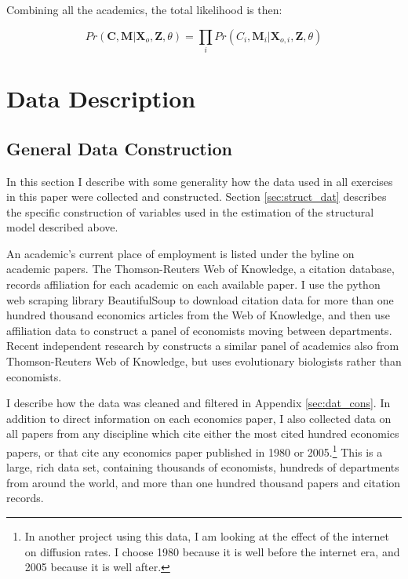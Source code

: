 Combining all the academics, the total likelihood is then:

\begin{equation}
    Pr(\mathbf{C},\mathbf{M}|\mathbf{X}_o,\mathbf{Z},\theta) = \prod_i Pr(C_i,\mathbf{M}_i|\mathbf{X}_{o,i}, \mathbf{Z}, \theta)
    \label{eq:fulllik}
\end{equation}

\section{Data Description}
\label{sec:dat}

\subsection{General Data Construction}

In this section I describe with some generality how the data used in all
exercises in this paper were collected and constructed.  Section
\ref{sec:struct_dat} describes the specific construction of variables
used in the estimation of the structural model described above.

An academic's current place of employment is listed under the byline on
academic papers. The Thomson-Reuters Web of Knowledge, a citation
database, records affiliation for each academic on each available paper. I use the
python web scraping library BeautifulSoup to download citation data for
more than one hundred thousand economics articles from the Web of
Knowledge, and then use affiliation data to construct a panel of
economists moving between departments. Recent independent research by
\citet{agrawal2013why} constructs a similar panel of academics also from
Thomson-Reuters Web of Knowledge, but uses evolutionary biologists rather than economists.

I describe how the data was cleaned and filtered in
Appendix \ref{sec:dat_cons}. In addition to direct information on each economics paper, I
also collected data on all papers from any discipline which cite either the
most cited hundred economics papers, or that cite any economics paper
published in 1980 or 2005.\footnote{In another project using this data, I am looking at the 
    effect of the internet on diffusion rates.  I choose 1980 because it is well before the internet era, 
and 2005 because it is well after.}  This is a large, rich data set, containing thousands
of economists, hundreds of departments from around the world, and more than 
one hundred thousand papers and citation records.

